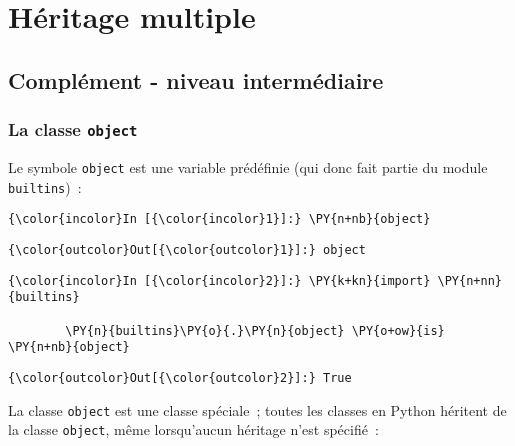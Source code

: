     
    
    
    

    

    \hypertarget{huxe9ritage-multiple}{%
\section{Héritage multiple}\label{huxe9ritage-multiple}}

    \hypertarget{compluxe9ment---niveau-intermuxe9diaire}{%
\subsection{Complément - niveau
intermédiaire}\label{compluxe9ment---niveau-intermuxe9diaire}}

    \hypertarget{la-classe-object}{%
\subsubsection{\texorpdfstring{La classe
\texttt{object}}{La classe object}}\label{la-classe-object}}

    Le symbole \texttt{object} est une variable prédéfinie (qui donc fait
partie du module \texttt{builtins})~:

    \begin{Verbatim}[commandchars=\\\{\}]
{\color{incolor}In [{\color{incolor}1}]:} \PY{n+nb}{object}
\end{Verbatim}


\begin{Verbatim}[commandchars=\\\{\}]
{\color{outcolor}Out[{\color{outcolor}1}]:} object
\end{Verbatim}
            
    \begin{Verbatim}[commandchars=\\\{\}]
{\color{incolor}In [{\color{incolor}2}]:} \PY{k+kn}{import} \PY{n+nn}{builtins}
        
        \PY{n}{builtins}\PY{o}{.}\PY{n}{object} \PY{o+ow}{is} \PY{n+nb}{object}
\end{Verbatim}


\begin{Verbatim}[commandchars=\\\{\}]
{\color{outcolor}Out[{\color{outcolor}2}]:} True
\end{Verbatim}
            
    La classe \texttt{object} est une classe spéciale~; toutes les classes
en Python héritent de la classe \texttt{object}, même lorsqu'aucun
héritage n'est spécifié~:

